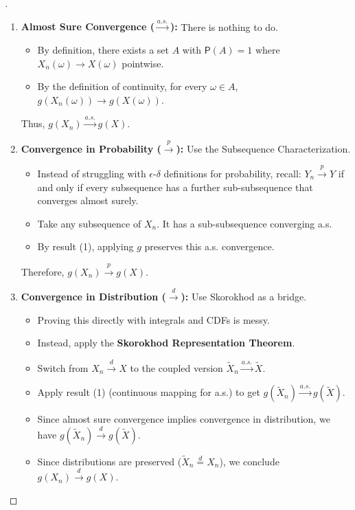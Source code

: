 \begin{proof}[]
    \leavevmode
\begin{enumerate}[]
    \item 
\textbf{Almost Sure Convergence ($\xrightarrow{a.s.}$):}
There is nothing to do.
\begin{itemize}
    \item By definition, there exists a set $A$ with $\mathsf{P}(A)=1$ where $X_n(\omega) \to X(\omega)$ pointwise.
    \item By the definition of continuity, for every $\omega \in A$, $g(X_n(\omega)) \to g(X(\omega))$.
\end{itemize}
    Thus, $g(X_n) \xrightarrow{a.s.} g(X)$.
\item 
\textbf{Convergence in Probability ($\xrightarrow{p}$):}
Use the Subsequence Characterization.
\begin{itemize}
    \item Instead of struggling with $\epsilon$-$\delta$ definitions for probability, recall: $Y_n \xrightarrow{p} Y$ if and only if every subsequence has a further sub-subsequence that converges almost surely.
    \item Take any subsequence of $X_n$. It has a sub-subsequence converging a.s.
    \item By result (1), applying $g$ preserves this a.s. convergence.
\end{itemize}
    Therefore, $g(X_n) \xrightarrow{p} g(X)$.

    \item 
\textbf{Convergence in Distribution ($\xrightarrow{d}$):}
Use Skorokhod as a bridge.
\begin{itemize}
    \item Proving this directly with integrals and CDFs is messy.
    \item Instead, apply the \textbf{Skorokhod Representation Theorem}.
    \item Switch from $X_n \xrightarrow{d} X$ to the coupled version $\tilde{X}_n \xrightarrow{a.s.} \tilde{X}$.
    \item Apply result (1) (continuous mapping for a.s.) to get $g(\tilde{X}_n) \xrightarrow{a.s.} g(\tilde{X})$.
    \item Since almost sure convergence implies convergence in distribution, we have $g(\tilde{X}_n) \xrightarrow{d} g(\tilde{X})$.
    \item Since distributions are preserved ($\tilde{X}_n \stackrel{d}{=} X_n$), we conclude $g(X_n) \xrightarrow{d} g(X)$.
\end{itemize}
\end{enumerate}    
\end{proof}


